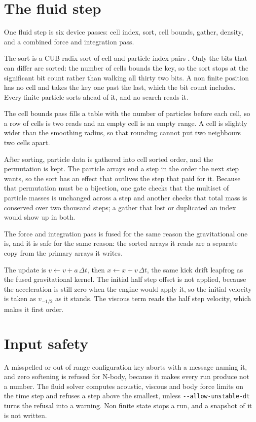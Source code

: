 \section{The fluid step}

One fluid step is six device passes: cell index, sort, cell bounds, gather, density,
and a combined force and integration pass.

The sort is a CUB radix sort of cell and particle index pairs \cite{cccl}. Only the
bits that can differ are sorted: the number of cells bounds the key, so the
sort stops at the significant bit count rather than walking all thirty two
bits. A non finite position has no cell and takes the key one past the last, which the
bit count includes. Every finite particle sorts ahead of it, and no search reads it.

The cell bounds pass fills a table with the number of particles before each cell, so a row
of cells is two reads and an empty cell is an empty range. A cell is slightly wider than the
smoothing radius, so that rounding cannot put two neighbours two cells apart.

After sorting, particle data is gathered into cell sorted order, and the
permutation is kept. The particle arrays end a step in the order the next step
wants, so the sort has an effect that outlives the step that paid for it.
Because that permutation must be a bijection, one gate checks that the multiset
of particle masses is unchanged across a step and another checks that total mass
is conserved over two thousand steps; a gather that lost or duplicated an index
would show up in both.

The force and integration pass is fused for the same reason the gravitational
one is, and it is safe for the same reason: the sorted arrays it reads are a
separate copy from the primary arrays it writes.

The update is $v \leftarrow v + a\,\Delta t$, then $x \leftarrow x + v\,\Delta t$, the same
kick drift leapfrog as the fused gravitational kernel. The initial half step offset is not
applied, because the acceleration is still zero when the engine would apply it, so the
initial velocity is taken as $v_{-1/2}$ as it stands. The viscous term reads the half step
velocity, which makes it first order.

\section{Input safety}

A misspelled or out of range configuration key aborts with a message naming it, and zero
softening is refused for N-body, because it makes every run produce not a number. The
fluid solver computes acoustic, viscous and body force limits on the time step and refuses a
step above the smallest, unless \verb|--allow-unstable-dt| turns the refusal into a warning.
Non finite state stops a run, and a snapshot of it is not written.

